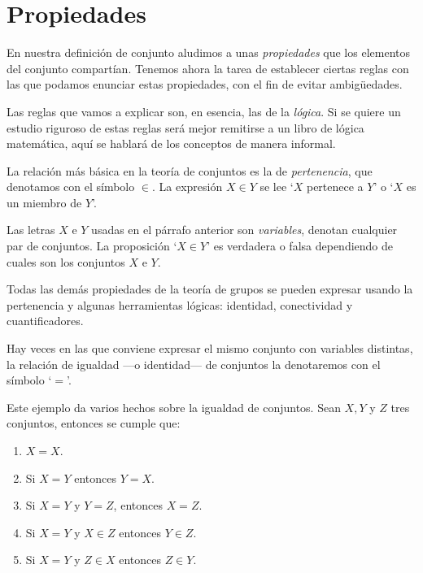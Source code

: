 \chapter{Propiedades}

En nuestra definición de conjunto aludimos a unas
\emph{propiedades} que los elementos del conjunto
compartían. Tenemos ahora la tarea de establecer
ciertas reglas con las que podamos enunciar estas
propiedades, con el fin de evitar ambigüedades. 

Las reglas que vamos a explicar son, en esencia, las de
la \emph{lógica}. Si se quiere un estudio riguroso de
estas reglas será mejor remitirse a un libro de lógica
matemática, aquí se hablará de los conceptos de manera
informal.

La relación más básica en la teoría de conjuntos es la
de \emph{pertenencia}, que denotamos con el símbolo
$\in$. La expresión $X\in Y$ se lee `$X$ pertenece a
$Y$' o `$X$ es un miembro de $Y$'.

Las letras $X$ e $Y$ usadas en el párrafo anterior son
\emph{variables}, denotan cualquier par de conjuntos.
La proposición `$X\in Y$' es verdadera o falsa
dependiendo de cuales son los conjuntos $X$ e $Y$.

Todas las demás propiedades de la teoría de grupos se
pueden expresar usando la pertenencia y algunas
herramientas lógicas: identidad, conectividad y
cuantificadores.

Hay veces en las que conviene expresar el mismo
conjunto con variables distintas, la relación de
igualdad ---o identidad--- de conjuntos la denotaremos
con el símbolo `$=$'.

\begin{ejem} Este ejemplo da varios hechos sobre la
	igualdad de conjuntos. Sean $X,Y$ y $Z$ tres
	conjuntos, entonces se cumple que:
	\begin{enumerate} 
		\item $X=X$.
		\item Si $X=Y$ entonces $Y=X$.
		\item Si $X=Y$ y
$Y=Z$, entonces $X=Z$.  
		\item Si $X=Y$ y $X\in Z$
entonces $Y\in Z$.
		\item Si $X=Y$ y $Z\in X$ entonces
$Z\in Y$.  \end{enumerate} \end{ejem}


